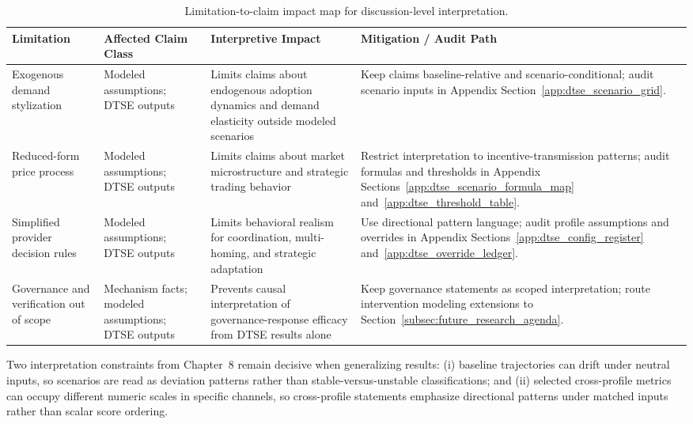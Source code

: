 \begin{table}[ht]
    \centering
    \footnotesize
    \renewcommand{\arraystretch}{1.2}
    \setlength{\tabcolsep}{4pt}
    \begin{tabularx}{\textwidth}{@{}>{\raggedright\arraybackslash}p{}>{\raggedright\arraybackslash}p{}>{\raggedright\arraybackslash}p{}X@{}}
        \toprule
        \textbf{Limitation} & \textbf{Affected Claim Class} & \textbf{Interpretive Impact} & \textbf{Mitigation / Audit Path} \\
        \midrule
        Exogenous demand stylization &
        Modeled assumptions; DTSE outputs &
        Limits claims about endogenous adoption dynamics and demand elasticity outside modeled scenarios &
        Keep claims baseline-relative and scenario-conditional; audit scenario inputs in Appendix Section~\ref{app:dtse_scenario_grid}. \\
        \addlinespace
        Reduced-form price process &
        Modeled assumptions; DTSE outputs &
        Limits claims about market microstructure and strategic trading behavior &
        Restrict interpretation to incentive-transmission patterns; audit formulas and thresholds in Appendix Sections~\ref{app:dtse_scenario_formula_map} and~\ref{app:dtse_threshold_table}. \\
        \addlinespace
        Simplified provider decision rules &
        Modeled assumptions; DTSE outputs &
        Limits behavioral realism for coordination, multi-homing, and strategic adaptation &
        Use directional pattern language; audit profile assumptions and overrides in Appendix Sections~\ref{app:dtse_config_register} and~\ref{app:dtse_override_ledger}. \\
        \addlinespace
        Governance and verification out of scope &
        Mechanism facts; modeled assumptions; DTSE outputs &
        Prevents causal interpretation of governance-response efficacy from DTSE results alone &
        Keep governance statements as scoped interpretation; route intervention modeling extensions to Section~\ref{subsec:future_research_agenda}. \\
        \bottomrule
    \end{tabularx}
    \caption{Limitation-to-claim impact map for discussion-level interpretation.}
    \label{tab:limitation_claim_impact_map}
\end{table}

Two interpretation constraints from Chapter~8 remain decisive when generalizing results: (i) baseline trajectories can drift under neutral inputs, so scenarios are read as deviation patterns rather than stable-versus-unstable classifications; and (ii) selected cross-profile metrics can occupy different numeric scales in specific channels, so cross-profile statements emphasize directional patterns under matched inputs rather than scalar score ordering.

